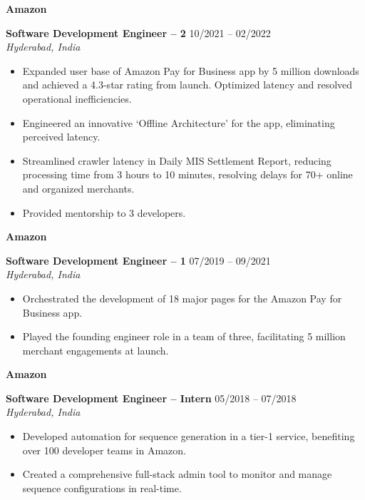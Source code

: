 \documentclass[a4paper,10pt]{article}
\newcommand{\company}[1]{{\normalsize\textbf{\color{primarycolor}#1}}}
\newcommand{\role}[1]{{\small\textbf{#1}}}
\newlength{\rightcolwidth}
\begin{document}
\begin{minipage}[t]{\rightcolwidth}
\vspace{0.5em}
\company{Amazon}

\role{Software Development Engineer -- 2} \hfill 10/2021 -- 02/2022\\
\small\textit{Hyderabad, India}

\begin{itemize}[leftmargin=*,itemsep=0.3em]
    \small
    \item Expanded user base of Amazon Pay for Business app by 5 million downloads and achieved a 4.3-star rating from launch. Optimized latency and resolved operational inefficiencies.
    \item Engineered an innovative `Offline Architecture' for the app, eliminating perceived latency.
    \item Streamlined crawler latency in Daily MIS Settlement Report, reducing processing time from 3 hours to 10 minutes, resolving delays for 70+ online and organized merchants.
    \item Provided mentorship to 3 developers.
\end{itemize}

\vspace{0.5em}
\company{Amazon}

\role{Software Development Engineer -- 1} \hfill 07/2019 -- 09/2021\\
\small\textit{Hyderabad, India}

\begin{itemize}[leftmargin=*,itemsep=0.3em]
    \small
    \item Orchestrated the development of 18 major pages for the Amazon Pay for Business app.
    \item Played the founding engineer role in a team of three, facilitating 5 million merchant engagements at launch.
\end{itemize}

\vspace{0.5em}
\company{Amazon}

\role{Software Development Engineer -- Intern} \hfill 05/2018 -- 07/2018\\
\small\textit{Hyderabad, India}

\begin{itemize}[leftmargin=*,itemsep=0.3em]
    \small
    \item Developed automation for sequence generation in a tier-1 service, benefiting over 100 developer teams in Amazon.
    \item Created a comprehensive full-stack admin tool to monitor and manage sequence configurations in real-time.
\end{itemize}

\end{minipage}
\end{document}
